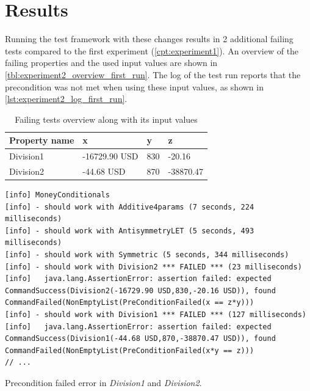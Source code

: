 \section{Results}
Running the test framework with these changes results in 2 additional failing tests
compared to the first experiment (\autoref{cpt:experiment1}). An overview of the
failing properties and the used input values are shown in
\autoref{tbl:experiment2_overview_first_run}. The log of the test run reports
that the precondition was not met when using these input values, as shown in
\autoref{lst:experiment2_log_first_run}.
\begin{table}[!ht]
\centering
\begin{tabular}{llll}
\hline
\textbf{Property name} & \textbf{x}    & \textbf{y} & \textbf{z} \\ \hline
Division1              & -16729.90 USD & 830        & -20.16     \\
Division2              & -44.68 USD    & 870        & -38870.47  \\ \hline
\end{tabular}
\caption{Failing tests overview along with its input values}
\label{tbl:experiment2_overview_first_run}
\end{table}
\FloatBarrier\noindent

\begin{sourcecode}[!ht]
\begin{lstlisting}[language=Log]
[info] MoneyConditionals
[info] - should work with Additive4params (7 seconds, 224 milliseconds)
[info] - should work with AntisymmetryLET (5 seconds, 493 milliseconds)
[info] - should work with Symmetric (5 seconds, 344 milliseconds)
[info] - should work with Division2 *** FAILED *** (23 milliseconds)
[info]   java.lang.AssertionError: assertion failed: expected CommandSuccess(Division2(-16729.90 USD,830,-20.16 USD)), found CommandFailed(NonEmptyList(PreConditionFailed(x == z*y)))
[info] - should work with Division1 *** FAILED *** (127 milliseconds)
[info]   java.lang.AssertionError: assertion failed: expected CommandSuccess(Division1(-44.68 USD,870,-38870.47 USD)), found CommandFailed(NonEmptyList(PreConditionFailed(x*y == z)))
// ...
\end{lstlisting}
\caption{Precondition failed error in \textit{Division1} and \textit{Division2}.}
\label{lst:experiment2_log_first_run}
\end{sourcecode}
\FloatBarrier\noindent

